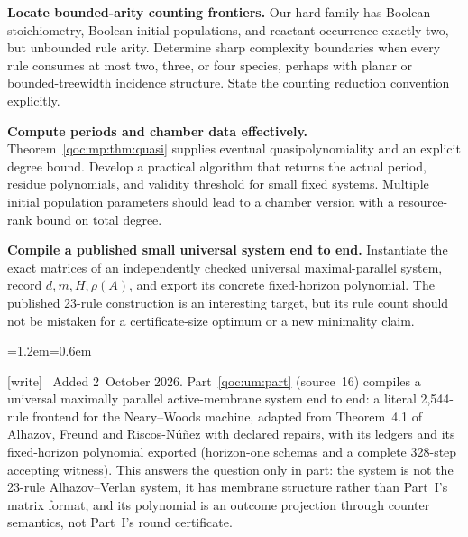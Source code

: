 \documentclass[11pt,letterpaper]{article}
\theoremstyle{definition}
\theoremstyle{remark}
\newcommand{\wtag}{\textup{[write]}}
\newenvironment{writenote}{\par\smallskip\begin{list}{}{\leftmargin=1.2em\rightmargin=0.6em}\item[]\small\wtag\ }{\end{list}\smallskip}
\begin{document}
\begin{enumerate}[label=\textbf{Q\arabic*.},leftmargin=3.0em]
\item \textbf{Locate bounded-arity counting frontiers.}
Our hard family has Boolean stoichiometry, Boolean initial populations,
and reactant occurrence exactly two, but unbounded rule arity. Determine
sharp complexity boundaries when every rule consumes at most two, three,
or four species, perhaps with planar or bounded-treewidth incidence
structure. State the counting reduction convention explicitly.

\item \textbf{Compute periods and chamber data effectively.}
Theorem~\ref{qoc:mp:thm:quasi} supplies eventual quasipolynomiality and an explicit
degree bound. Develop a practical algorithm that returns the actual
period, residue polynomials, and validity threshold for small fixed
systems. Multiple initial population parameters should lead to a chamber
version with a resource-rank bound on total degree.

\item \textbf{Compile a published small universal system end to end.}
Instantiate the exact matrices of an independently checked universal
maximal-parallel system, record $d,m,H,\rho(A)$, and export its concrete
fixed-horizon polynomial. The published 23-rule construction is an
interesting target, but its rule count should not be mistaken for a
certificate-size optimum or a new minimality claim.
\begin{writenote}
Added 2~October 2026. Part~\ref{qoc:um:part} (source~16) compiles a universal maximally parallel active-membrane system end to end: a literal 2,544-rule frontend for the Neary--Woods machine, adapted from Theorem~4.1 of Alhazov, Freund and Riscos-N\'u\~nez with declared repairs, with its ledgers and its fixed-horizon polynomial exported (horizon-one schemas and a complete 328-step accepting witness). This answers the question only in part: the system is not the 23-rule Alhazov--Verlan system, it has membrane structure rather than Part~I's matrix format, and its polynomial is an outcome projection through counter semantics, not Part~I's round certificate.
\end{writenote}


\end{enumerate}
\end{document}
